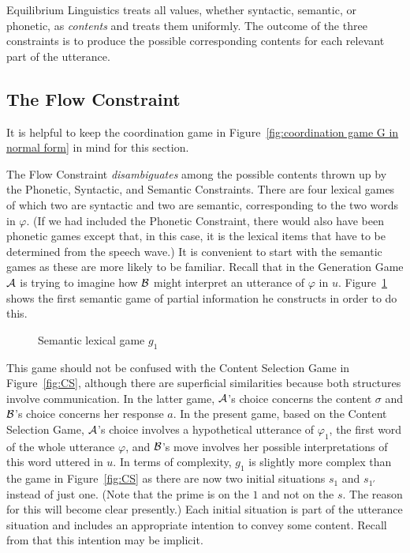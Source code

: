 Equilibrium Linguistics treats all values, whether syntactic, semantic, or phonetic, as \emph{contents} and treats them uniformly. The outcome of the three constraints is to produce the possible corresponding contents for each relevant part of the utterance.


\subsection{The Flow Constraint}

It is helpful to keep the coordination game in Figure~\ref{fig:coordination game G in normal form} in mind for this section.

The Flow Constraint \emph{disambiguates} among the possible contents thrown up by the Phonetic, Syntactic, and Semantic Constraints. There are four lexical games of which two are syntactic and two are semantic, corresponding to the two words in $\varphi$. (If we had included the Phonetic Constraint, there would also have been phonetic games except that, in this case, it is the lexical items that have to be determined from the speech wave.) It is convenient to start with the semantic games as these are more likely to be familiar. Recall that in the Generation Game $\cal A$ is trying to imagine how $\cal B$ might interpret an utterance of $\varphi$ in $u$. Figure~\ref{fig:semantic lexical game g1} shows the first semantic game of partial information he constructs in order to do this.

\begin{figure}[h] 

\caption{Semantic lexical game $g_1$}
\label{fig:semantic lexical game g1}
\end{figure}

This game should not be confused with the Content Selection Game in Figure~\ref{fig:CS}, although there are superficial similarities because both structures involve communication. In the latter game, $\cal A$'s choice concerns the content $\sigma$ and $\cal B$'s choice concerns her response $a$. In the present game, based on the Content Selection Game, $\cal A$'s choice involves a hypothetical utterance of $\varphi_1$, the first word of the whole utterance $\varphi$, and $\cal B$'s move involves her possible interpretations of this word uttered in $u$. In terms of complexity, $g_1$ is slightly more complex than the game in Figure~\ref{fig:CS} as there are now two initial situations $s_1$ and $s_{1'}$ instead of just one. (Note that the prime is on the $1$ and not on the $s$. The reason for this will become clear presently.) Each initial situation is part of the utterance situation and includes an appropriate intention to convey some content. Recall from  that this intention may be implicit.

